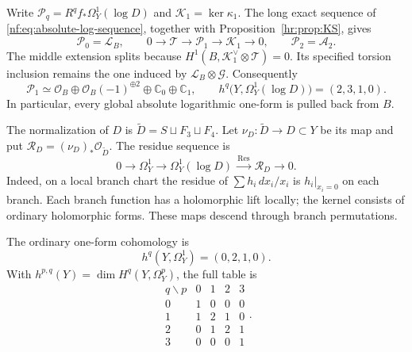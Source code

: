 Write
$\mathcal P_q=R^qf_*\Omega_Y^1(\log D)$ and
$\mathcal K_1=\ker\kappa_1$.
The long exact sequence of
\eqref{nf:eq:absolute-log-sequence}, together with
Proposition~\ref{hr:prop:KS}, gives
\begin{equation}\label{hr:eq:absolute-direct-images}
 \mathcal P_0=\mathscr L_B,\qquad
 0\longrightarrow\mathcal T\longrightarrow\mathcal P_1
 \longrightarrow\mathcal K_1\longrightarrow0,\qquad
 \mathcal P_2=\mathcal A_2.
\end{equation}
The middle extension splits because
$H^1(B,\mathcal K_1^\vee\otimes\mathcal T)=0$.
Its specified torsion inclusion remains the one induced
by $\mathscr L_B\otimes\mathcal G$.
Consequently
\[
 \mathcal P_1\simeq
 \mathcal O_B\oplus\mathcal O_B(-1)^{\oplus2}
                \oplus\mathbb C_0\oplus\mathbb C_1,
 \qquad
 h^q\bigl(Y,\Omega_Y^1(\log D)\bigr)=(2,3,1,0).
\]
In particular, every global absolute logarithmic
one-form is pulled back from $B$.

The normalization of $D$ is
$\widetilde D=S\sqcup F_3\sqcup F_4$.
Let $\nu_D:\widetilde D\to D\subset Y$ be its map and
put $\mathcal R_D=(\nu_D)_*\mathcal O_{\widetilde D}$.
The residue sequence is
\begin{equation}\label{hr:eq:residue-sequence}
 0\longrightarrow\Omega_Y^1
 \longrightarrow\Omega_Y^1(\log D)
 \xrightarrow{\ \operatorname{Res}\ }\mathcal R_D
 \longrightarrow0.
\end{equation}
Indeed, on a local branch chart the residue of
$\sum h_i\,dx_i/x_i$ is $h_i|_{x_i=0}$ on each branch.
Each branch function has a holomorphic lift locally;
the kernel consists of ordinary holomorphic forms.
These maps descend through branch permutations.

\begin{theorem}\label{hr:thm:hodge}
The ordinary one-form cohomology is
\[
 h^q(Y,\Omega_Y^1)=(0,2,1,0).
\]
With $h^{p,q}(Y)=\dim H^q(Y,\Omega_Y^p)$, the full table is
\begin{equation}\label{hr:eq:hodge-table}
 \begin{array}{c|rrrr}
 q\backslash p&0&1&2&3\\ \hline
 0&1&0&0&0\\
 1&1&2&1&0\\
 2&0&1&2&1\\
 3&0&0&0&1
 \end{array}.
\end{equation}
\end{theorem}

